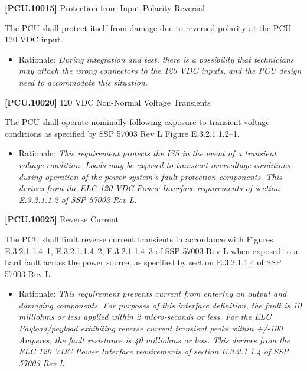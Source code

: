 \textbf{[PCU.10015]} Protection from Input Polarity Reversal

The \gls{PCU} shall protect itself from damage due to reversed polarity at the \gls{PCU} 120 \gls{VDC} input.

\begin{itemize}
\item{} Rationale: \emph{During integration and test, there is a possibility that technicians may attach the wrong connectors to the 120 VDC inputs, and the PCU design need to accommodate this situation.}

\end{itemize}

\textbf{[PCU.10020]} 120 \gls{VDC} Non-Normal Voltage Transients

The \gls{PCU} shall operate nominally following exposure to transient voltage conditions as specified by SSP 57003 Rev L Figure E.3.2.1.1.2--1.

\begin{itemize}
\item{} Rationale: \emph{This requirement protects the ISS in the event of a transient voltage condition. Loads may be exposed to transient overvoltage conditions during operation of the power system's fault protection components. This derives from the ELC 120 VDC Power Interface requirements of section E.3.2.1.1.2 of SSP 57003 Rev L.}

\end{itemize}

\textbf{[PCU.10025]} Reverse Current

The \gls{PCU} shall limit reverse current transients in accordance with Figures E.3.2.1.1.4--1, E.3.2.1.1.4--2, E.3.2.1.1.4--3 of SSP 57003 Rev L when exposed to a hard fault across the power source, as specified by section E.3.2.1.1.4 of SSP 57003 Rev L.

\begin{itemize}
\item{} Rationale: \emph{This requirement prevents current from entering an output and damaging components. For purposes of this interface definition, the fault is 10 milliohms or less applied within 2 micro-seconds or less. For the ELC Payload\slash payload exhibiting reverse current transient peaks within +\slash -100 Amperes, the fault resistance is 40 milliohms or less. This derives from the ELC 120 VDC Power Interface requirements of section E.3.2.1.1.4 of SSP 57003 Rev L.}

\end{itemize}

